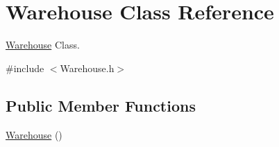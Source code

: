 \hypertarget{classWarehouse}{}\section{Warehouse Class Reference}
\label{classWarehouse}


\hyperlink{classWarehouse}{Warehouse} Class.  




{\ttfamily \#include $<$Warehouse.\+h$>$}

\subsection*{Public Member Functions}
\begin{DoxyCompactItemize}
\item 
\hyperlink{classWarehouse_af8d6c7e60cb3be65b35702b400e8fad7}{Warehouse} ()\hypertarget{classWarehouse_af8d6c7e60cb3be65b35702b400e8fad7}{}\label{classWarehouse_af8d6c7e60cb3be65b35702b400e8fad7}


\end{DoxyCompactItemize}

